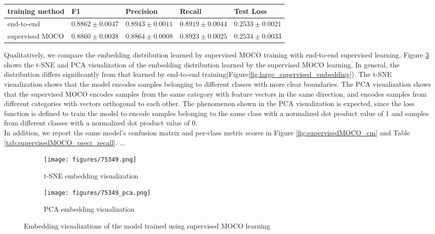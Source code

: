 \documentclass[12pt,twoside]{report}
\begin{document}
\begin{table}[]
    \centering
    \begin{tabular}{lllll}
    \toprule
    training method & F1 & Precision & Recall & Test Loss \\
    \midrule
    end-to-end & $0.8862 \pm 0.0047$ & $0.8943 \pm 0.0011$ & $0.8919 \pm 0.0044$ & $0.2533 \pm 0.0021$ \\
    \midrule
    supervised MOCO & $0.8860 \pm 0.0038$ & $0.8864 \pm 0.0008$ & $0.8923 \pm 0.0025$ & $0.2534 \pm 0.0033$\\
    \bottomrule
    \end{tabular}
    \captionsetup{type=table}
    \label{tab:supervisedMOCO_final}
\end{table}

Qualitatively, we compare the embedding distribution learned by supervised MOCO training with end-to-end supervised learning. Figure \ref{fig:supervisedMOCO_embedding} shows the t-SNE and PCA visualization of the embedding distribution learned by the supervised MOCO learning. In general, the distribution differs significantly from that learned by end-to-end training(Figure\ref{fig:large_supervised_embedding}). The t-SNE visualization shows that the model encodes samples belonging to different classes with more clear boundaries. The PCA visualization shows that the supervised MOCO encodes samples from the same category with feature vectors in the same direction, and encodes samples from different categories with vectors orthogonal to each other. The phenomenon shown in the PCA visualization is expected, since the loss function is defined to train the model to encode samples belonging to the same class with a normalized dot product value of 1 and samples from different classes with a normalized dot product value of 0. \\

In addition, we report the same model's confusion matrix and per-class metric scores in Figure \ref{fig:supervisedMOCO_cm} and Table \ref{tab:supervisedMOCO_preci_recall}. ...

\begin{figure}
\centering
    \begin{subfigure}{.45\textwidth}
      \centering
      \texttt{[image: figures/75349.png]}
      \caption{t-SNE embedding visualization}
      \label{fig:supervisedMOCO_tsne}
    \end{subfigure}%
    \begin{subfigure}{.45\textwidth}
      \centering
      \texttt{[image: figures/75349\_pca.png]}
      \caption{PCA embedding visualization}
      \label{fig:supervisedMOCO_pca}
    \end{subfigure}
    \caption{Embedding visualizations of the model trained using supervised MOCO learning}
    \label{fig:supervisedMOCO_embedding}
\end{figure}
\end{document}
